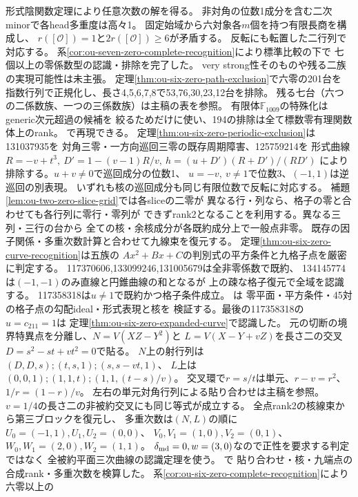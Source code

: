 \documentclass[11pt,a4paper]{ltjsarticle}
\begin{document}
形式陰関数定理により任意次数の解を得る。
非対角の位数1成分を含む二次minorで各head多重度は高々1。
固定始域から六対象各$m$個を持つ有限長商を構成し、
$r([\mathcal O])=1$と$2r([\mathcal O])\geq6$が矛盾する。
反転にも転置した二行列で対応する。
系\ref{cor:ou-seven-zero-complete-recognition}により標準比較の下で
七個以上の零係数型の認識・排除を完了した。
very strong性そのものや残る二族の実現可能性は未主張。
定理\ref{thm:ou-six-zero-path-exclusion}で六零の201台を
指数行列で正規化し、長さ4,5,6,7,8で53,76,30,23,12台を排除。
残る七台（六つの二係数族、一つの三係数族）は主稿の表を参照。
有限体$\mathbb F_{1009}$の特殊化はgeneric次元超過の候補を
絞るためだけに使い、194の排除は全て標数零有理関数体上のrank。
で再現できる。
定理\ref{thm:ou-six-zero-periodic-exclusion}は131037935を
対角三零・一方向巡回三零の既存周期障害、125759214を
形式曲線$R=-v+t^3,\ D'=1-(v-1)R/v,\ h=(u+D')(R+D')/(RD')$
により排除する。$u+v\ne0$で巡回成分の位数1、
$u=-v,\ v\ne1$で位数3、$(-1,1)$は逆巡回の別表現。
いずれも核の巡回成分も同じ有限位数で反転に対応する。
補題\ref{lem:ou-two-zero-slice-grid}では各sliceの二零が
異なる行・列なら、格子の零と合わせても各行列に零行・零列が
できずrank2となることを利用する。異なる三列・三行の台から
全ての核・余核成分が各既約成分上で一般点非零。
既存の因子関係・多重次数計算と合わせて九線束を復元する。
定理\ref{thm:ou-six-zero-curve-recognition}は五族の
$Ax^2+Bx+C$の判別式の平方条件と九格子点を厳密に判定する。
117370606,133099246,131005679は全非零係数で既約、
134145774は$(-1,-1)$のみ直線と円錐曲線の和となるが
上の疎な格子復元で全域を認識する。
117358318は$u\ne1$で既約かつ格子条件成立。
は
零平面・平方条件・45対の格子点の勾配ideal・形式表現と核を
検証する。最後の117358318の$u=c_{211}=1$は
定理\ref{thm:ou-six-zero-expanded-curve}で認識した。
元の切断の境界特異点を分離し、$N=V(XZ-Y^2)$と
$L=V(X-Y+vZ)$を長さ二の交叉$D=s^2-st+vt^2=0$で貼る。
$N$上の射行列は$(D,D,s);(t,s,1);(s,s-vt,1)$、
$L$上は$(0,0,1);(1,1,t);(1,1,(t-s)/v)$。
交叉環で$r=s/t$は単元、$r-v=r^2$、$1/r=(1-r)/v$。
左右の単元対角行列による貼り合わせは主稿を参照。
$v=1/4$の長さ二の非被約交叉にも同じ等式が成立する。
全点rank2の核線束から第三ブロックを復元し、
多重次数は$(N,L)$の順に$U_0=(-1,1),U_1,U_2=(0,0)$、
$V_0,V_1=(1,0),V_2=(0,1)$、
$W_0,W_1=(2,0),W_2=(1,1)$。
$\delta_{\rm md}=0,w=(3,0)$なので正性を要求する判定ではなく
全被約平面三次曲線の認識定理を使う。
で
貼り合わせ・核・九端点の合成rank・多重次数を検算した。
系\ref{cor:ou-six-zero-complete-recognition}により六零以上の
\end{document}
